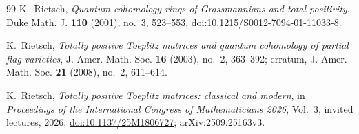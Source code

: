 \documentclass[11pt]{amsart}
\theoremstyle{definition}
\theoremstyle{remark}
\begin{document}
\begin{thebibliography}{99}
K.~Rietsch,
\emph{Quantum cohomology rings of Grassmannians and total positivity},
Duke Math. J. \textbf{110} (2001), no.~3, 523--553,
\href{https://doi.org/10.1215/S0012-7094-01-11033-8}{doi:10.1215/S0012-7094-01-11033-8}.

K.~Rietsch,
\emph{Totally positive Toeplitz matrices and quantum cohomology of partial flag varieties},
J. Amer. Math. Soc. \textbf{16} (2003), no.~2, 363--392;
erratum, J. Amer. Math. Soc. \textbf{21} (2008), no.~2, 611--614.

K.~Rietsch,
\emph{Totally positive Toeplitz matrices: classical and modern},
in \emph{Proceedings of the International Congress of Mathematicians 2026},
Vol.~3, invited lectures, 2026,
\href{https://doi.org/10.1137/25M1806727}{doi:10.1137/25M1806727};
arXiv:2509.25163v3.

\end{thebibliography}
\end{document}
